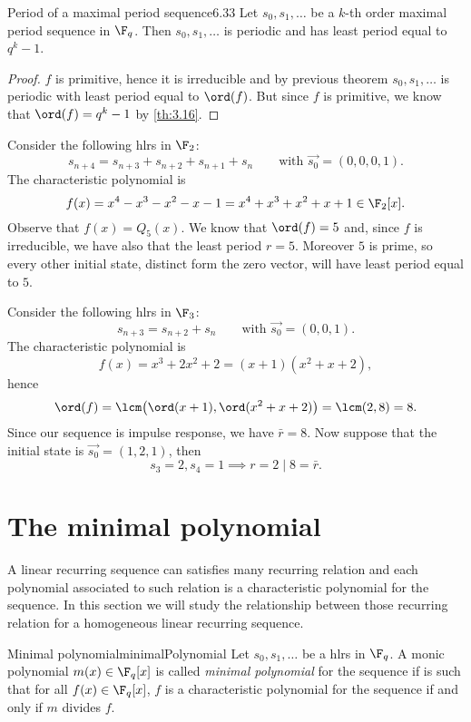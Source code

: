 \begin{teor}{Period of a maximal period sequence}{6.33}
	Let \(s_0,s_1,\ldots\) be a \(k\)-th order maximal period sequence in \(\F_q\). Then \(s_0,s_1,\ldots\) is periodic and has least period equal to \(q^k-1\).
\end{teor}

\begin{proof}
	\(f\) is primitive, hence it is irreducible and by previous theorem \(s_0,s_1,\ldots\) is periodic with least period equal to \(\ord(f)\). But since \(f\) is primitive, we know that \(\ord(f)=q^k-1\) by \autoref{th:3.16}.
\end{proof}

\begin{ese}
	Consider the following hlrs in \(\F_2\):
	\[
		s_{n+4}=s_{n+3}+s_{n+2}+s_{n+1}+s_n \qquad\text{with }\vec{s_0}=(0,0,0,1).
	\]
	The characteristic polynomial is
	\[
		f(x) = x^4-x^3-x^2-x-1 = x^4+x^3+x^2+x+1 \in \F_2[x].
	\]
	Observe that \(f(x) =Q_5(x)\). We know that \(\ord(f)=5\) and, since \(f\) is irreducible, we have also that the least period \(r=5\). Moreover \(5\) is prime, so every other initial state, distinct form the zero vector, will have least period equal to \(5\).
\end{ese}

\begin{ese}
	Consider the following hlrs in \(\F_3\):
	\[
		s_{n+3}=s_{n+2}+s_n \qquad\text{with }\vec{s_0}=(0,0,1).
	\]
	The characteristic polynomial is
	\[
		f(x) = x^3+2x^2+2 = (x+1)(x^2+x+2),
	\]
	hence
	\[
		\ord(f) = \lcm\big(\ord(x+1),\ord(x^2+x+2)\big) = \lcm(2,8) = 8.
	\]
	Since our sequence is impulse response, we have \(\bar{r}=8\).
	Now suppose that the initial state is \(\vec{s_0}=(1,2,1)\), then
	\[
		s_3=2,s_4 = 1 \implies r = 2 \mid 8 = \bar{r}.
	\]
\end{ese}

\section{The minimal polynomial}

A linear recurring sequence can satisfies many recurring relation and each polynomial associated to such relation is a characteristic polynomial for the sequence. In this section we will study the relationship between those recurring relation for a homogeneous linear recurring sequence.

\begin{defn}{Minimal polynomial}{minimalPolynomial}
	Let \(s_0,s_1,\ldots\) be a hlrs in \(\F_q\). A monic polynomial \(m(x)\in\F_q[x]\) is called \emph{minimal polynomial} for the sequence if is such that for all \(f(x)\in\F_q[x]\), \(f\) is a characteristic polynomial for the sequence if and only if \(m\) divides \(f\).
\end{defn}

